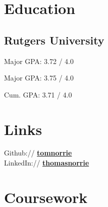 \documentclass[letterpaper]{deedy-resume} %
\begin{document}
	\begin{minipage}[t]{0.33\textwidth} %
		
		
		\section{Education} 

		\subsection{Rutgers University}
		Major GPA: 3.72 / 4.0
		
		\sectionspace %
		Major GPA: 3.75 / 4.0
		
		\sectionspace %
		Cum. GPA: 3.71 / 4.0\\
		\sectionspace
		
		
		\section{Links} 
		
		Github:// \href{https://github.com/tomnorrie}{\bf tomnorrie} \\
		LinkedIn:// \href{https://www.linkedin.com/in/thomasnorrie/}{\bf thomasnorrie} \\
		
		\sectionspace %
		
		
		\section{Coursework}
		

\end{minipage}
\end{document}
